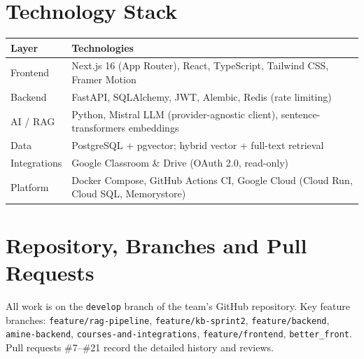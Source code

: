 \documentclass[11pt,a4paper]{article}
\begin{document}
\section{Technology Stack}
\begin{tabularx}{\textwidth}{@{}p{3.2cm} Y@{}}
\toprule
\textbf{Layer} & \textbf{Technologies}\\
\midrule
Frontend & Next.js 16 (App Router), React, TypeScript, Tailwind CSS, Framer Motion\\
Backend & FastAPI, SQLAlchemy, JWT, Alembic, Redis (rate limiting)\\
AI / RAG & Python, Mistral LLM (provider-agnostic client), sentence-transformers embeddings\\
Data & PostgreSQL + pgvector; hybrid vector + full-text retrieval\\
Integrations & Google Classroom \& Drive (OAuth 2.0, read-only)\\
Platform & Docker Compose, GitHub Actions CI, Google Cloud (Cloud Run, Cloud SQL, Memorystore)\\
\bottomrule
\end{tabularx}

\section{Repository, Branches and Pull Requests}
All work is on the \texttt{develop} branch of the team's GitHub repository. Key feature branches: \texttt{feature/rag-pipeline}, \texttt{feature/kb-sprint2}, \texttt{feature/backend}, \texttt{amine-backend}, \texttt{courses-and-integrations}, \texttt{feature/frontend}, \texttt{better\_front}. Pull requests \#7--\#21 record the detailed history and reviews.
\end{document}
